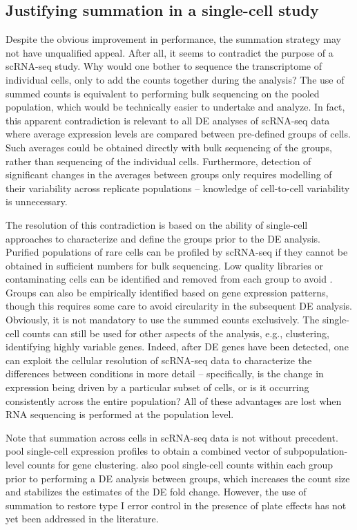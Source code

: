 \documentclass[oupdraft]{bio}
\begin{document}
\subsection{Justifying summation in a single-cell study}
Despite the obvious improvement in performance, the summation strategy may not have unqualified appeal.
After all, it seems to contradict the purpose of a scRNA-seq study. 
Why would one bother to sequence the transcriptome of individual cells, only to add the counts together during the analysis?
The use of summed counts is equivalent to performing bulk sequencing on the pooled population, which would be technically easier to undertake and analyze.
In fact, this apparent contradiction is relevant to all DE analyses of scRNA-seq data where average expression levels are compared between pre-defined groups of cells.
Such averages could be obtained directly with bulk sequencing of the groups, rather than sequencing of the individual cells.
Furthermore, detection of significant changes in the averages between groups only requires modelling of their variability across replicate populations -- knowledge of cell-to-cell variability is unnecessary. 

The resolution of this contradiction is based on the ability of single-cell approaches to characterize and define the groups prior to the DE analysis.
Purified populations of rare cells can be profiled by scRNA-seq if they cannot be obtained in sufficient numbers for bulk sequencing.
Low quality libraries or contaminating cells can be identified and removed from each group to avoid .
Groups can also be empirically identified based on gene expression patterns, though this requires some care to avoid circularity in the subsequent DE analysis.
Obviously, it is not mandatory to use the summed counts exclusively. 
The single-cell counts can still be used for other aspects of the analysis, e.g., clustering, identifying highly variable genes.
Indeed, after DE genes have been detected, one can exploit the cellular resolution of scRNA-seq data to characterize the differences between conditions in more detail \citep{korthauer2016statistical} -- specifically, is the change in expression being driven by a particular subset of cells, or is it occurring consistently across the entire population?
All of these advantages are lost when RNA sequencing is performed at the population level.

Note that summation across cells in scRNA-seq data is not without precedent.
\cite{jaitin2014massively} pool single-cell expression profiles to obtain a combined vector of subpopulation-level counts for gene clustering.
\cite{klein2015droplet} also pool single-cell counts within each group prior to performing a DE analysis between groups,
    which increases the count size and stabilizes the estimates of the DE fold change.
However, the use of summation to restore type I error control in the presence of plate effects has not yet been addressed in the literature.
\end{document}
